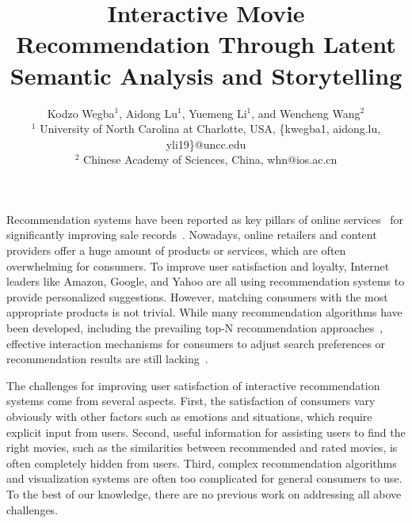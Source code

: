 \documentclass{vgtc}                          %
\title{Interactive Movie Recommendation Through Latent Semantic Analysis and Storytelling}
\author{Kodzo Wegba$^{1}$, Aidong Lu$^{1}$, Yuemeng Li$^{1}$, and Wencheng Wang$^{2}$\\
$^1$ University of North Carolina at Charlotte, USA, \{kwegba1, aidong.lu, yli19\}@uncc.edu\\
$^2$ Chinese Academy of Sciences, China, whn@ios.ac.cn
}
\begin{document}


\maketitle

%


Recommendation systems have been reported as key pillars of online services~\cite{Gomez-Uribe:2015:NRS:2869770.2843948} for significantly improving sale records~\cite{1167344}.
Nowadays, online retailers and content providers offer a huge amount of products or services, which are often overwhelming for consumers.
To improve user satisfaction and loyalty, Internet leaders like Amazon, Google, and Yahoo are all using recommendation systems to provide personalized suggestions.
However, matching consumers with the most appropriate products is not trivial.
While many recommendation algorithms have been developed, including 
the prevailing top-N recommendation approaches~\cite{Deshpande:2004:ITN:963770.963776}, effective interaction mechanisms for consumers to adjust search preferences or recommendation results are still lacking~\cite{loepp2014choice}.

The challenges for improving user satisfaction of interactive recommendation systems come from several aspects.
First, the satisfaction of consumers vary obviously with other factors such as emotions and situations, which require explicit input from users.
Second, useful information for assisting users to find the right movies, such as the similarities between recommended and rated movies, is often completely hidden from users.
Third, complex recommendation algorithms and visualization systems are often too complicated for general consumers to use.
To the best of our knowledge, there are no previous work on addressing all above challenges.
\end{document}
